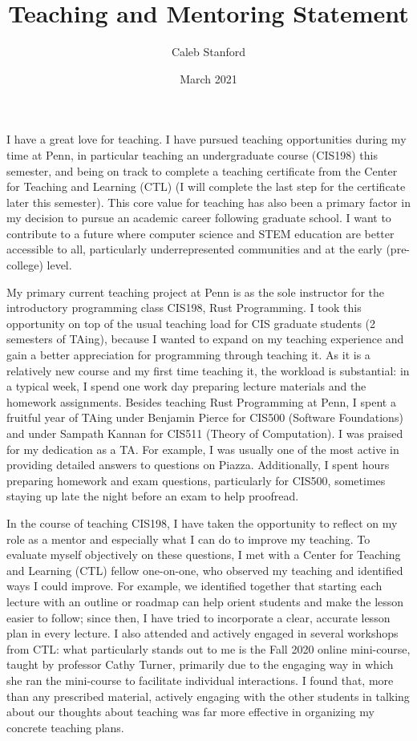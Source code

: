 \documentclass{article}
\title{Teaching and Mentoring Statement}
\author{Caleb Stanford}
\date{March 2021}
\begin{document}
\maketitle{}

I have a great love for teaching.
I have pursued teaching opportunities during my time at Penn, in particular teaching an undergraduate course (CIS198) this semester,
and being on track to complete a teaching certificate from the Center for Teaching and Learning (CTL) (I will complete the last step for the certificate later this semester).
This core value for teaching has also been a primary factor in my decision to pursue an academic career following graduate school.
I want to contribute to a future where computer science and STEM education are better accessible to all, particularly underrepresented communities and at the early (pre-college) level.

My primary current teaching project at Penn is as the sole instructor for the introductory programming class CIS198, Rust Programming.
I took this opportunity on top of the usual teaching load for CIS graduate students (2 semesters of TAing),
because I wanted to expand on my teaching experience and gain a better
appreciation for programming through teaching it.
As it is a relatively new course and my first time teaching it, the workload is substantial: in a typical week,
I spend one work day preparing lecture materials and the homework assignments.
Besides teaching Rust Programming at Penn, I spent a fruitful year of TAing under Benjamin Pierce for CIS500 (Software Foundations) and under Sampath Kannan for CIS511 (Theory of Computation). I was praised for my dedication as a TA. For example, I was usually one of the most active in providing detailed answers to questions on Piazza. Additionally, I spent hours preparing homework and exam questions, particularly for CIS500, sometimes staying up late the night before an exam to help proofread.

In the course of teaching CIS198, I have taken the opportunity to reflect on my role as a mentor
and especially what I can do to improve my teaching.
To evaluate myself objectively on these questions, I met with a Center for Teaching and Learning (CTL) fellow one-on-one, who observed my teaching and identified ways I could improve.
For example, we identified together that starting each lecture with an outline or
roadmap can help orient students and make the lesson easier to follow; since then, I have tried to incorporate a clear, accurate lesson plan in every lecture.
I also attended and actively engaged in several workshops from CTL: what particularly stands out to me is the
Fall 2020 online mini-course, taught by professor Cathy Turner, primarily due to the engaging way in which she ran the mini-course to facilitate individual interactions. I found that, more than any prescribed material, actively engaging with the other students in talking about our thoughts about teaching was far more effective in organizing my concrete teaching plans.
\end{document}
